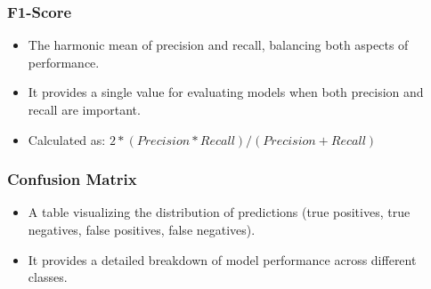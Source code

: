         \subsubsection{F1-Score}
            \begin{itemize}
                \item The harmonic mean of precision and recall, balancing both aspects of performance.
                \item It provides a single value for evaluating models when both precision and recall are important.
                \item Calculated as: $2 * (Precision * Recall) / (Precision + Recall)$
            \end{itemize}
        \subsubsection{Confusion Matrix}
            \begin{itemize}
                \item A table visualizing the distribution of predictions (true positives, true negatives, false positives, false negatives).
                \item It provides a detailed breakdown of model performance across different classes.
            \end{itemize}
